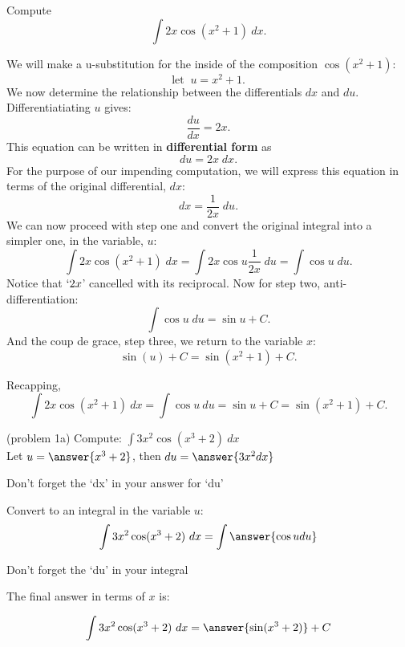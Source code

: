 \documentclass[handout]{ximera}
\begin{document}



\begin{example}[example 1]
Compute 
\[\int 2x\cos(x^2 + 1) \ dx.\]

We will make a u-substitution for the inside of the composition $\cos(x^2 + 1)$:\
\[
\text{let} \;\; u = x^2 + 1.  
\]
We now determine the relationship between the differentials $dx$ and $du$.
Differentiatiating $u$ gives:
\[
\frac{du}{dx} = 2x.
\]
This equation can be written in \textbf{differential form} as
\[
du = 2x \; dx.
\]
For the purpose of our impending computation, we will express this equation in terms of the original differential, $dx$:
\[
dx = \frac{1}{2x} \; du.
\]
We can now proceed with step one and convert the original integral into a simpler one, in the variable, $u$:
\[
\int  2x\cos(x^2 + 1) \; dx = \int 2x\cos u \frac{1}{2x} \; du = \int \cos u \; du.
\]
Notice that \;$`2x$' \; cancelled with its reciprocal. Now for step two, anti-differentiation:
\[
\int \cos u \; du = \sin u + C.
\]
And the coup de grace, step three, we return to the variable $x$:
\[
\sin(u) + C = \sin(x^2 + 1) + C.
\]

Recapping,
\[\int 2x\cos(x^2 + 1) \ dx = \int \cos u \ du =  \sin u + C =  \sin(x^2 + 1) + C.\]




\end{example}



\begin{problem}(problem 1a) 
Compute: $\displaystyle{\int 3x^2\cos(x^3 + 2) \ dx}$\\
Let $u = \answer{x^3 + 2}$, then $du = \answer{3x^2 dx}$\\
\begin{hint}
Don't forget the `dx' in your answer for `du'
\end{hint}
Convert to an integral in the variable $u$:
\[\int 3x^2\cos(x^3 + 2) \ dx = \int\answer{\cos u du}\]
\begin{hint}
Don't forget the `du' in your integral
\end{hint}
The final answer in terms of $x$ is:

\[\int 3x^2\cos(x^3 + 2) \ dx = \answer{\sin(x^3 + 2)} +C\]
\end{problem}
\end{document}
